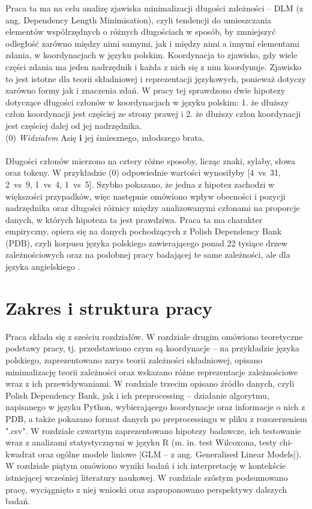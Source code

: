 \documentclass[licencjacka]{pracamgr_Kogni}
\begin{document}
Praca ta ma na celu analizę zjawiska minimalizacji długości zależności – DLM (z ang. Dependency Length Minimisation), czyli tendencji do umieszczania elementów współrzędnych o różnych długościach w sposób, by zmniejszyć odległość zarówno między nimi samymi, jak i między nimi a innymi elementami zdania, w koordynacjach w języku polskim. Koordynacja to zjawisko, gdy wiele części zdania ma jeden nadrzędnik i każda z nich się z nim koordynuje. Zjawisko to jest istotne dla teorii składniowej i reprezentacji językowych, ponieważ dotyczy zarówno formy jak i znaczenia zdań. W pracy tej sprawdzono dwie hipotezy dotyczące długości członów w koordynacjach w języku polskim: 1. że dłuższy człon koordynacji jest częściej ze strony prawej i 2. że dłuższy człon koordynacji jest częściej dalej od jej nadrzędnika.
\\

(0) \textit{Widziałem} Asię \textbf{i} jej śmiesznego, młodszego brata. \\
\\
Długości członów mierzono na cztery różne sposoby, licząc znaki, sylaby, słowa oraz tokeny. W przykładzie (0) odpowiednie wartości wynosiłyby [4~vs~31, 2~vs~9, 1~vs~4, 1~vs~5]. Szybko pokazano, że jedna z hipotez zachodzi w większości przypadków, więc następnie omówiono wpływ obecności i pozycji nadrzędnika oraz długości różnicy między analizowanymi członami na proporcje danych, w których hipoteza ta jest prawdziwa. Praca ta ma charakter empiryczny, opiera się na danych pochodzących z Polish Dependency Bank (PDB), czyli korpusu języka polskiego zawierającego ponad 22 tysiące drzew zależnościowych oraz na podobnej pracy badającej te same zależności, ale dla języka angielskiego \citep{AnonimoweNieopublikowane}.

\section{Zakres i struktura pracy}
Praca składa się z sześciu rozdziałów. W rozdziale drugim omówiono teoretyczne podstawy pracy, tj. przedstawiono czym są koordynacje -- na przykładzie języka polskiego, zaprezentowano zarys teorii zależności składniowej, opisano minimalizację teorii zależności oraz wskazano różne reprezentacje zależnościowe wraz z ich przewidywaniami. W rozdziale trzecim opisano źródło danych, czyli Polish Dependency Bank, jak i ich preprocessing -- działanie algorytmu, napisanego w języku Python, wybierającego koordynacje oraz informacje o nich z PDB, a także pokazano format danych po preprocessingu w pliku z rozszerzeniem ".csv". W rozdziale czwartym zaprezentowano hipotezy badawcze, ich testowanie wraz z analizami statystycznymi w języku R (m. in. test Wilcoxona, testy chi-kwadrat oraz ogólne modele liniowe [GLM – z ang. Generalised Linear Models]). W rozdziale piątym omówiono wyniki badań i ich interpretację w kontekście istniejącej wcześniej literatury naukowej. W rozdziale szóstym podsumowano pracę, wyciągnięto z niej wnioski oraz zaproponowano perspektywy dalszych badań. 
\end{document}
